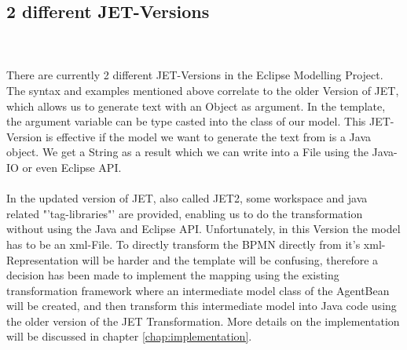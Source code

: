 \subsection{2 different JET-Versions}\\\\
There are currently 2 different JET-Versions in the Eclipse Modelling Project. The syntax and examples mentioned above correlate to the older Version of JET, which allows us to generate text with an Object as argument. In the template, the argument variable can be type casted into the class of our model. This JET-Version is effective if the model we want to generate the text from is a Java object. We get a String as a result which we can write into a File using the Java-IO or even Eclipse API.\\\\

In the updated version of JET, also called JET2, some workspace and java related "'tag-libraries"' are provided, enabling us to do the transformation without using the Java and Eclipse API. Unfortunately, in this Version the model has to be an xml-File.
To directly transform the BPMN directly from it's xml-Representation will be harder and the template will be confusing, therefore a decision has been made to implement the mapping using the existing transformation framework where an intermediate model class of the AgentBean will be created, and then transform this intermediate model into Java code using the older version of the JET Transformation.
More details on the implementation will be discussed in chapter \ref{chap:implementation}.